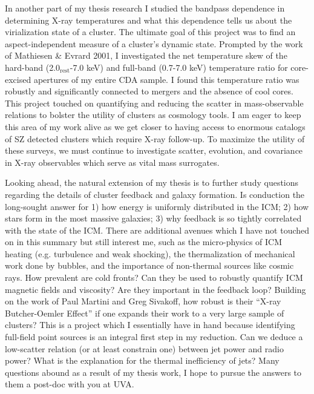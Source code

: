 \documentclass[11pt]{article}
\begin{document}
In another part of my thesis research I studied the bandpass
dependence in determining X-ray temperatures and what this dependence
tells us about the virialization state of a cluster. The ultimate goal
of this project was to find an aspect-independent measure of a
cluster's dynamic state. Prompted by the work of Mathiesen \& Evrard
2001, I investigated the net temperature skew of the hard-band
(2.0$_{\mathrm{rest}}$-7.0 keV) and full-band (0.7-7.0 keV) temperature ratio
for core-excised apertures of my entire CDA sample. I found this
temperature ratio was robustly and significantly connected to mergers
and the absence of cool cores. This project touched on quantifying and
reducing the scatter in mass-observable relations to bolster the
utility of clusters as cosmology tools. I am eager to keep this area
of my work alive as we get closer to having access to enormous
catalogs of SZ detected clusters which require X-ray follow-up. To
maximize the utility of these surveys, we must continue to investigate
scatter, evolution, and covariance in X-ray observables which serve as
vital mass surrogates.

Looking ahead, the natural extension of my thesis is to further study
questions regarding the details of cluster feedback and galaxy
formation. Is conduction the long-sought answer for 1) how energy is
uniformly distributed in the ICM; 2) how stars form in the most
massive galaxies; 3) why feedback is so tightly correlated with the
state of the ICM. There are additional avenues which I have not
touched on in this summary but still interest me, such as the
micro-physics of ICM heating (e.g. turbulence and weak shocking), the
thermalization of mechanical work done by bubbles, and the importance
of non-thermal sources like cosmic rays. How prevalent are cold
fronts? Can they be used to robustly quantify ICM magnetic fields and
viscosity? Are they important in the feedback loop? Building on the
work of Paul Martini and Greg Sivakoff, how robust is their ``X-ray
Butcher-Oemler Effect'' if one expands their work to a very large
sample of clusters? This is a project which I essentially have in hand
because identifying full-field point sources is an integral first step
in my reduction. Can we deduce a low-scatter relation (or at least
constrain one) between jet power and radio power? What is the
explanation for the thermal inefficiency of jets? Many questions
abound as a result of my thesis work, I hope to pursue the answers to
them a post-doc with you at UVA.
\end{document}
